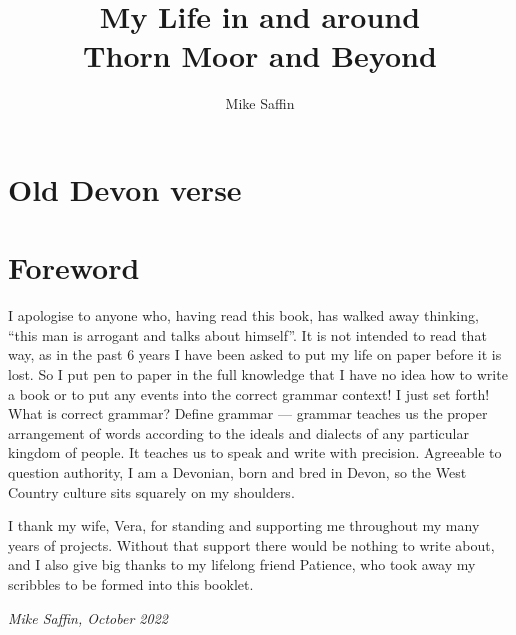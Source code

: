 \documentclass[twoside,11pt,a5paper]{memoir}
\title{My Life in and around\\Thorn Moor and Beyond}
\author{Mike Saffin}
\date{}
\begin{document}
% 

\maketitle

\chapter*{Old Devon verse}


\chapter*{Foreword}

I apologise to anyone who, having read this book, has walked away thinking,
``this man is arrogant and talks about himself''. It is not intended to read
that way, as in the past 6 years I have been asked to put my life on paper
before it is lost. So I put pen to paper in the full knowledge that I have no
idea how to write a book or to put any events into the correct grammar
context! I just set forth! What is correct grammar? Define grammar --- grammar
teaches us the proper arrangement of words according to the ideals and dialects
of any particular kingdom of people. It teaches us to speak and write with
precision. Agreeable to question authority, I am a Devonian, born and bred in
Devon, so the West Country culture sits squarely on my shoulders.

I thank my wife, Vera, for standing and supporting me throughout my many years
of projects. Without that support there would be nothing to write about, and I
also give big thanks to my lifelong friend Patience, who took away my scribbles
to be formed into this booklet.

\bigskip

\emph{Mike Saffin, October 2022}

\chapter{}


\chapter{}

\chapter{}

\chapter{}

\end{document}
